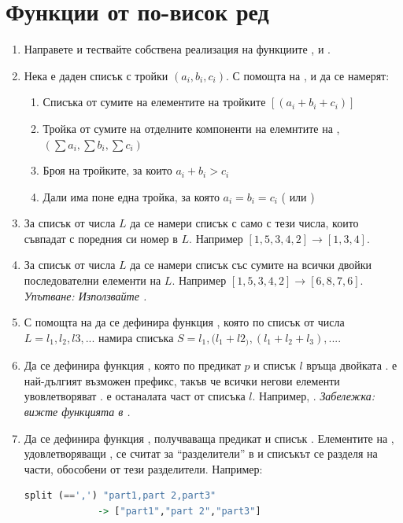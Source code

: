 \section {Функции от по-висок ред}

\begin{enumerate}[]
	\item Направете и тествайте собствена реализация на функциите ,  и .
	\item Нека е даден списък  с тройки $(a_i,b_i,c_i)$. С помощта на ,  и  да се намерят:
	
	\begin{enumerate}[label=\alph*)]
		\item Списъка от сумите на елементите на тройките $[(a_i+b_i+c_i)]$
		\item Тройка от сумите на отделните компоненти на елемнтите на , $(\sum a_i,\sum b_i, \sum c_i)$
		\item Броя на тройките, за които $a_i+b_i>c_i$
		\item Дали има поне една тройка, за която $a_i=b_i=c_i$ ( или )
	\end{enumerate}
	\item За списък от числа $L$ да се намери списък с само с тези числа, които съвпадат с поредния си номер в $L$. Например $[1,5,3,4,2] \rightarrow [1,3,4]$.

	\item За списък от числа $L$ да се намери списък със сумите на всички двойки последователни елементи на $L$. Например $[1,5,3,4,2] \rightarrow [6,8,7,6]$. \emph{Упътване: Използвайте .}
	
	\item С помощта на  да се дефинира функция , която по списък от числа $L=l_1,l_2,l3,...$ намира списъка $S=l_1,(l_1+l2_),(l_1+l_2+l_3),...$. 
	
	\item Да се дефинира функция , която по предикат $p$ и списък $l$ връща двойката .  е най-дългият възможен префикс, такъв че всички негови елементи увовлетворяват .  е останалата част от списъка $l$. Например, . \emph{Забележка: вижте функцията   в .}
	
	\item \label{zad:split}Да се дефинира функция , получваваща предикат  и списък . Елементите на , удовлетворяващи , се считат за ``разделители'' в  и списъкът се разделя на части, обособени от тези разделители. Например:
\begin{lstlisting}[basicstyle=\small,language=Haskell]
split (==',') "part1,part 2,part3" 
             -> ["part1","part 2","part3"]
\end{lstlisting}
\end{enumerate}

